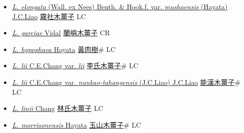 \begin{itemize}
\begin{itemize}
        \item[] \href{http://www.theplantlist.org/tpl1.1/search?q=Litsea+elongata+var.+mushaensis}{\textit{L. elongata} (Wall. ex Nees) Benth. \& Hook.f. var. \textit{mushaensis} (Hayata) J.C.Liao}   \href{\detokenize{http://taibnet.sinica.edu.tw/chi/taibnet_species_list.php?T2=霧社木薑子&T2_new_value=true&fr=y}}{霧社木薑子} LC
        \item[] \href{http://www.theplantlist.org/tpl1.1/search?q=Litsea+garciae}{\textit{L. garciae} Vidal}   \href{\detokenize{http://taibnet.sinica.edu.tw/chi/taibnet_species_list.php?T2=蘭嶼木薑子&T2_new_value=true&fr=y}}{蘭嶼木薑子} CR
        \item[] \href{http://www.theplantlist.org/tpl1.1/search?q=Litsea+hypophaea}{\textit{L. hypophaea} Hayata}   \href{\detokenize{http://taibnet.sinica.edu.tw/chi/taibnet_species_list.php?T2=黃肉樹&T2_new_value=true&fr=y}}{黃肉樹}\# LC
        \item[] \href{http://www.theplantlist.org/tpl1.1/search?q=Litsea+lii+var.+lii}{\textit{L. lii} C.E.Chang var. \textit{lii}}   \href{\detokenize{http://taibnet.sinica.edu.tw/chi/taibnet_species_list.php?T2=李氏木薑子&T2_new_value=true&fr=y}}{李氏木薑子}\# LC
        \item[] \href{http://www.theplantlist.org/tpl1.1/search?q=Litsea+lii+var.+nunkao-tahangensis}{\textit{L. lii} C.E.Chang var. \textit{nunkao-tahangensis} (J.C.Liao) J.C.Liao}   \href{\detokenize{http://taibnet.sinica.edu.tw/chi/taibnet_species_list.php?T2=能漢木薑子&T2_new_value=true&fr=y}}{能漢木薑子}\# LC
        \item[] \href{http://www.theplantlist.org/tpl1.1/search?q=Litsea+linii}{\textit{L. linii} Chang}   \href{\detokenize{http://taibnet.sinica.edu.tw/chi/taibnet_species_list.php?T2=林氏木薑子&T2_new_value=true&fr=y}}{林氏木薑子} LC
        \item[] \href{http://www.theplantlist.org/tpl1.1/search?q=Litsea+morrisonensis}{\textit{L. morrisonensis} Hayata}   \href{\detokenize{http://taibnet.sinica.edu.tw/chi/taibnet_species_list.php?T2=玉山木薑子&T2_new_value=true&fr=y}}{玉山木薑子}\# LC

\end{itemize}
\end{itemize}
